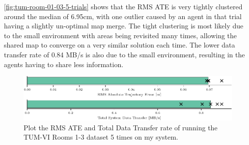 \autoref{fig:tum-room-01-03-5-trials} shows that the RMS ATE is very tightly clustered around the median of 6.95cm, with one outlier caused by an agent in that trial having a slightly un-optimal map merge. The tight clustering is most likely due to the small environment with areas being revisited many times, allowing the shared map to converge on a very similar solution each time. The lower data transfer rate of 0.84 MB/s is also due to the small environment, resulting in the agents having to share less information.

\begin{figure}[h]
    \centering
    \includegraphics[width=0.8\linewidth]{figures/comparison_apr11_tum_room_trajectory_a.pdf}

    \caption{Plot the RMS ATE and Total Data Transfer rate of running the TUM-VI Rooms 1-3 dataset 5 times on my system.}
    \label{fig:tum-room-01-03-5-trials}
\end{figure}

